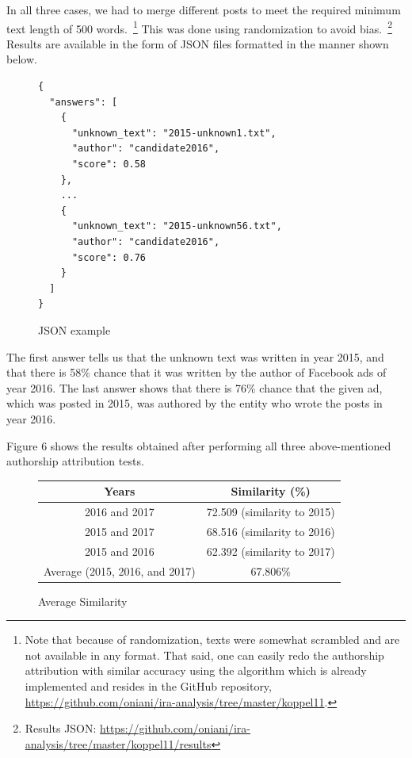 \documentclass{article}
\begin{document}
In all three cases, we had to merge different posts to meet the required
minimum text length of 500 words.~\footnote{Note that because of randomization,
texts were somewhat scrambled and are not available in any format. That said,
one can easily redo the authorship attribution with similar accuracy using the
algorithm which is already implemented and resides in the GitHub repository,
\url{https://github.com/oniani/ira-analysis/tree/master/koppel11}.} This was
done using randomization to avoid bias.~\footnote{Results JSON:
\url{https://github.com/oniani/ira-analysis/tree/master/koppel11/results}}
Results are available in the form of JSON files formatted in the manner shown
below.

\begin{figure}[H]
\begin{verbatim}
{
  "answers": [
    {
      "unknown_text": "2015-unknown1.txt",
      "author": "candidate2016",
      "score": 0.58
    },
    ...
    {
      "unknown_text": "2015-unknown56.txt",
      "author": "candidate2016",
      "score": 0.76
    }
  ]
}
\end{verbatim}
\caption{JSON example}
\end{figure}

The first answer tells us that the unknown text was written in year 2015, and
that there is 58\% chance that it was written by the author of Facebook ads of
year 2016. The last answer shows that there is 76\% chance that the given ad,
which was posted in 2015, was authored by the entity who wrote the posts in
year 2016.

\medskip

Figure 6 shows the results obtained after performing all three above-mentioned
authorship attribution tests.

\begin{figure}[H]
  \centering
  \begin{tabular}{*{2}{c}}
    \toprule
    Years & Similarity (\%)\\
    \midrule
    2016 and 2017 & 72.509 (similarity to 2015)\\
    \midrule
    2015 and 2017 & 68.516 (similarity to 2016)\\
    \midrule
    2015 and 2016 & 62.392 (similarity to 2017)\\
    \midrule
    Average (2015, 2016, and 2017) & 67.806\%\\
    \bottomrule
  \end{tabular}
  \caption{Average Similarity}
\end{figure}
\end{document}
